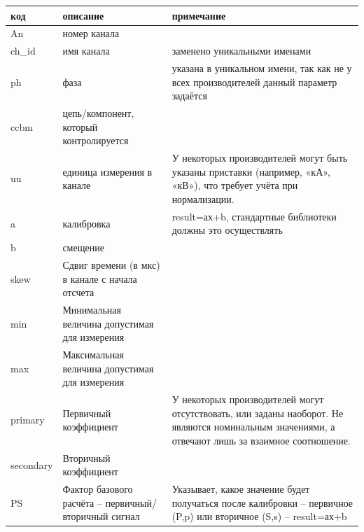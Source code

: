 
\mbox{}\par\vspace{0.2cm}
{\small
\noindent
\begin{tabularx}{\textwidth}{|>{\centering\arraybackslash}p{2.0cm}|>{\raggedright\arraybackslash}p{5.6cm}|>{\raggedright\arraybackslash}X|}
\hline
\textbf{код} &
\textbf{описание} &
\textbf{примечание} \\
\hline
An &
номер канала &
\\
\hline
ch\_id &
имя канала &
заменено уникальными именами \\
\hline
ph &
фаза &
указана в уникальном имени, так как не у всех производителей данный параметр задаётся \\
\hline
ccbm &
цепь/компонент, который контролируется &
\\
\hline
uu &
единица измерения в канале &
У некоторых производителей могут быть указаны приставки (например, «кА», «кВ»), что
требует учёта при нормализации. \\
\hline
a &
калибровка &
result=ах+b, стандартные библиотеки должны это осуществлять \\
\cline{1-2}
b &
смещение &
\\
\hline
skew &
Сдвиг времени (в мкс) в канале с начала отсчета &
\\
\hline
min &
Минимальная величина допустимая для измерения &
\\
\hline
max &
Максимальная величина допустимая для измерения &
\\
\hline
primary &
Первичный коэффициент &
У некоторых производителей могут отсутствовать, или заданы наоборот. Не являются
номинальным значениями, а отвечают лишь за взаимное соотношение. \\
\cline{1-2}
secondary &
Вторичный коэффициент &
\\
\hline
PS &
Фактор базового расчёта -- первичный/вторичный сигнал &
Указывает, какое значение будет получаться после калибровки -- первичное (P,p) или
вторичное (S,s) -- result=ах+b \\
\hline
\end{tabularx}
}
